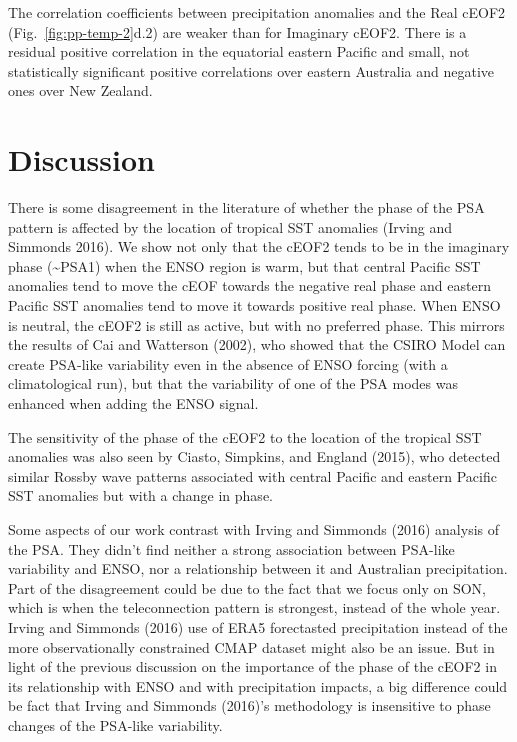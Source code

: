 \documentclass[smallextended]{svjour3}       %
\begin{document}
The correlation coefficients between precipitation anomalies and the Real cEOF2 (Fig.~\ref{fig:pp-temp-2}d.2) are weaker than for Imaginary cEOF2.
There is a residual positive correlation in the equatorial eastern Pacific and small, not statistically significant positive correlations over eastern Australia and negative ones over New Zealand.

\hypertarget{discussion}{%
\section{Discussion}\label{discussion}}

There is some disagreement in the literature of whether the phase of the PSA pattern is affected by the location of tropical SST anomalies (Irving and Simmonds 2016).
We show not only that the cEOF2 tends to be in the imaginary phase (\textasciitilde PSA1) when the ENSO region is warm, but that central Pacific SST anomalies tend to move the cEOF towards the negative real phase and eastern Pacific SST anomalies tend to move it towards positive real phase.
When ENSO is neutral, the cEOF2 is still as active, but with no preferred phase.
This mirrors the results of Cai and Watterson (2002), who showed that the CSIRO Model can create PSA-like variability even in the absence of ENSO forcing (with a climatological run), but that the variability of one of the PSA modes was enhanced when adding the ENSO signal.

The sensitivity of the phase of the cEOF2 to the location of the tropical SST anomalies was also seen by Ciasto, Simpkins, and England (2015), who detected similar Rossby wave patterns associated with central Pacific and eastern Pacific SST anomalies but with a change in phase.

Some aspects of our work contrast with Irving and Simmonds (2016) analysis of the PSA.
They didn't find neither a strong association between PSA-like variability and ENSO, nor a relationship between it and Australian precipitation.
Part of the disagreement could be due to the fact that we focus only on SON, which is when the teleconnection pattern is strongest, instead of the whole year.
Irving and Simmonds (2016) use of ERA5 forectasted precipitation instead of the more observationally constrained CMAP dataset might also be an issue.
But in light of the previous discussion on the importance of the phase of the cEOF2 in its relationship with ENSO and with precipitation impacts, a big difference could be fact that Irving and Simmonds (2016)'s methodology is insensitive to phase changes of the PSA-like variability.
\end{document}
